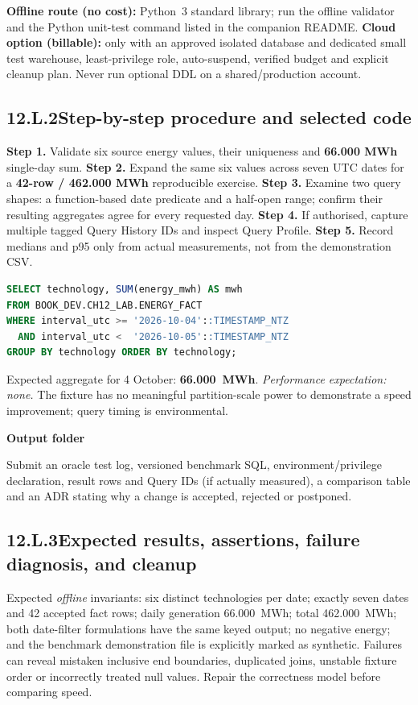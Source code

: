 \documentclass[11pt,twoside]{article}
\newcommand{\topic}[2]{\subsection*{#1\quad #2}}
\begin{document}
\textbf{Offline route (no cost):} Python~3 standard library; run the offline validator and the Python unit-test command listed in the companion README. \textbf{Cloud option (billable):} only with an approved isolated database and dedicated small test warehouse, least-privilege role, auto-suspend, verified budget and explicit cleanup plan. Never run optional DDL on a shared/production account.
\topic{12.L.2}{Step-by-step procedure and selected code}
\textbf{Step 1.} Validate six source energy values, their uniqueness and \textbf{66.000 MWh} single-day sum. \textbf{Step 2.} Expand the same six values across seven UTC dates for a \textbf{42-row / 462.000 MWh} reproducible exercise. \textbf{Step 3.} Examine two query shapes: a function-based date predicate and a half-open range; confirm their resulting aggregates agree for every requested day. \textbf{Step 4.} If authorised, capture multiple tagged Query History IDs and inspect Query Profile. \textbf{Step 5.} Record medians and p95 only from actual measurements, not from the demonstration CSV.
\begin{lstlisting}[language=SQL,caption={Sample range query from the companion: 4 October only.}]
SELECT technology, SUM(energy_mwh) AS mwh
FROM BOOK_DEV.CH12_LAB.ENERGY_FACT
WHERE interval_utc >= '2026-10-04'::TIMESTAMP_NTZ
  AND interval_utc <  '2026-10-05'::TIMESTAMP_NTZ
GROUP BY technology ORDER BY technology;
\end{lstlisting}
Expected aggregate for 4 October: \textbf{66.000~MWh}. \emph{Performance expectation: none.} The fixture has no meaningful partition-scale power to demonstrate a speed improvement; query timing is environmental.
\begin{whitebox}\textbf{Output folder}\par
Submit an oracle test log, versioned benchmark SQL, environment/privilege declaration, result rows and Query IDs (if actually measured), a comparison table and an ADR stating why a change is accepted, rejected or postponed.\end{whitebox}
\newpage
\topic{12.L.3}{Expected results, assertions, failure diagnosis, and cleanup}
Expected \emph{offline} invariants: six distinct technologies per date; exactly seven dates and 42 accepted fact rows; daily generation 66.000~MWh; total 462.000~MWh; both date-filter formulations have the same keyed output; no negative energy; and the benchmark demonstration file is explicitly marked as synthetic. Failures can reveal mistaken inclusive end boundaries, duplicated joins, unstable fixture order or incorrectly treated null values. Repair the correctness model before comparing speed.
\end{document}
